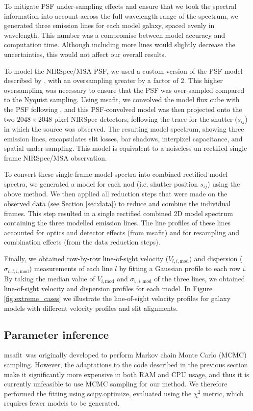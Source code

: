 \documentclass{aa}
\newcommand{\msafit}{{\sc msafit}}
\begin{document}
To mitigate PSF under-sampling effects and ensure that we took the spectral information into account across the full wavelength range of the spectrum, we generated three emission lines for each model galaxy, spaced evenly in wavelength. This number was a compromise between model accuracy and computation time. Although including more lines would slightly decrease the uncertainties, this would not affect our overall results. 

To model the NIRSpec/MSA PSF, we used a custom version of the PSF model described by \citet{AdeGraaff2024_kinematics}, with an oversampling greater by a factor of 2. This higher oversampling was necessary to ensure that the PSF was over-sampled compared to the Nyquist sampling.
Using \msafit, we convolved the model flux cube with the PSF following \citet{AdeGraaff2024_kinematics}, and this PSF-convolved model was then projected onto the two $2048\times2048$ pixel NIRSpec detectors, following the trace for the shutter ($s_{ij}$) in which the source was observed. The resulting model spectrum, showing three emission lines, encapsulates slit losses, bar shadows, interpixel capacitance, and spatial under-sampling. This model is equivalent to a noiseless un-rectified single-frame NIRSpec/MSA observation. 

To convert these single-frame model spectra into combined rectified model spectra, we generated a model for each nod (i.e. shutter position $s_{ij}$) using the above method. We then applied all reduction steps that were made on the observed data (see Section \ref{sec:data}) to reduce and combine the individual frames. This step resulted in a single rectified combined 2D model spectrum containing the three modelled emission lines. The line profiles of these lines accounted for optics and detector effects (from \msafit) and for resampling and combination effects (from the data reduction steps).

Finally, we obtained  row-by-row line-of-sight velocity ($V_{l,i,\text{mod}}$) and dispersion ($\sigma_{v,l,i,\text{mod}}$) measurements of each line $l$ by fitting a Gaussian profile to each row $i$. By taking the median value of $V_{i,\text{mod}}$ and $\sigma_{v,i,\text{mod}}$ of the three lines, we obtained line-of-sight velocity and dispersion profiles for each model. In Figure \ref{fig:extreme_cases} we illustrate the line-of-sight velocity profiles for galaxy models with different velocity profiles and slit alignments.

\subsection{Parameter inference}\label{sec:sampling}
\msafit\ was originally developed to perform Markov chain Monte Carlo (MCMC) sampling. However, the adaptations to the code described in the previous section make it significantly more expensive in both RAM and CPU usage,  and thus it is currently unfeasible to use MCMC sampling for our method. We therefore performed the fitting using {\sc scipy.optimize}, evaluated using the $\chi^2$ metric, which requires fewer models to be generated.
\end{document}
